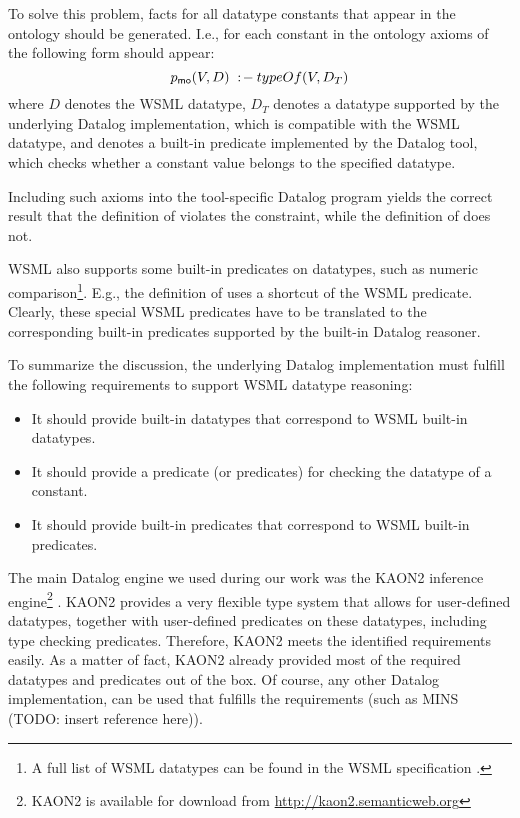 To solve this problem, \pmo facts for all datatype constants that
appear in the ontology should be generated. I.e., for each
constant in the ontology axioms of the following form should
appear:
\begin{displaymath}
    p_{\mathrm{\sf mo}}(V,D) \;:\!-\: typeOf(V, D_T)
\end{displaymath} where $D$ denotes the WSML datatype, $D_T$ denotes a datatype supported by the underlying Datalog implementation, which is compatible with the WSML datatype, and \typeof denotes a built-in predicate implemented by the Datalog tool, which checks whether a constant value belongs to the specified datatype.

Including such axioms into the tool-specific Datalog program
yields the correct result that the definition of 
violates the  constraint, while the definition of
 does not.

WSML also supports some built-in predicates on datatypes, such as
numeric comparison\footnote{A full list of WSML datatypes can be
found in the WSML specification \cite{wsml-spec}.}. E.g., the
definition of  uses a shortcut of the WSML
 predicate. Clearly, these special WSML
predicates have to be translated to the corresponding built-in
predicates supported by the built-in Datalog reasoner.

To summarize the discussion, the underlying Datalog implementation
must fulfill the following requirements to support WSML datatype
reasoning:
\begin{itemize}
    \item It should provide built-in datatypes that correspond to WSML built-in datatypes.
    \item It should provide a predicate (or predicates) for checking the datatype of a constant.
    \item It should provide built-in predicates that correspond to WSML built-in predicates.
\end{itemize}

The main Datalog engine we used during our work was the KAON2
inference engine\footnote{KAON2 is available for download from
\url{http://kaon2.semanticweb.org}} \cite{hustadt04reducing}.
KAON2 provides a very flexible type system that allows for
user-defined datatypes, together with user-defined predicates on
these datatypes, including type checking predicates. Therefore,
KAON2 meets the identified requirements easily. As a matter of
fact, KAON2 already provided most of the required datatypes and
predicates out of the box. Of course, any other Datalog
implementation, can be used that fulfills the requirements (such
as MINS (TODO: insert reference here)).
